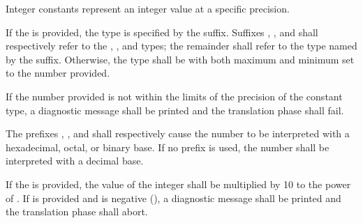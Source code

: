 Integer constants represent an integer value at a specific precision.

\specsubitem
If the  is provided, the type is specified by the
suffix. Suffixes , ,  and  shall
respectively refer to the , , and 
types; the remainder shall refer to the type named by the suffix. Otherwise,
the type shall be  with both maximum and minimum set to the
number provided.

\specsubitem
If the number provided is not within the limits of the precision of the
constant type, a diagnostic message shall be printed and the translation phase
shall fail.

\specsubitem
The prefixes , , and  shall respectively
cause the number to be interpreted with a hexadecimal, octal, or binary base.
If no prefix is used, the number shall be interpreted with a decimal base.

\specsubitem
If the  is provided, the value of the
integer shall be multiplied by 10 to the power of .
If  is provided and is negative (\terminal{-}), a diagnostic
message shall be printed and the translation phase shall abort.

